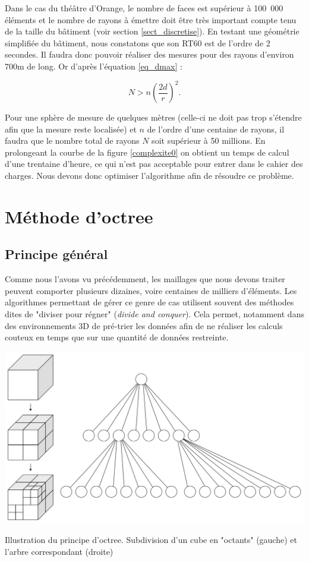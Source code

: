 Dans le cas du théâtre d'Orange, le nombre de faces est supérieur à 100~000 éléments et le nombre de rayons à émettre doit être très important compte tenu de la taille du bâtiment (voir section \ref{sect_discretise}). En testant une géométrie simplifiée du bâtiment, nous constatons que son \gls{RT60} est de l'ordre de 2 secondes. Il faudra donc pouvoir réaliser des mesures pour des rayons d'environ 700m de long. Or d'après l'équation \ref{eq_dmax} :

\begin{equation}
N > n\left(\frac{2d}{r}\right)^2.
\end{equation}

Pour une sphère de mesure de quelques mètres (celle-ci ne doit pas trop s'étendre afin que la mesure reste localisée) et $n$ de l'ordre d'une centaine de rayons, il faudra que le nombre total de rayons $N$ soit supérieur à 50 millions. En prolongeant la courbe de la figure \ref{complexite0} on obtient un temps de calcul d'une trentaine d'heure, ce qui n'est pas acceptable pour entrer dans le cahier des charges. Nous devons donc optimiser l'algorithme afin de résoudre ce problème.

\section{Méthode d'octree}
\subsection{Principe général} \label{sect_octree_gene}

Comme nous l'avons vu précédemment, les maillages que nous devons traiter peuvent comporter plusieurs dizaines, voire centaines de milliers d'éléments. Les algorithmes permettant de gérer ce genre de cas utilisent souvent des méthodes dites de "diviser pour régner" (\textit{divide and conquer}). Cela permet, notamment dans des environnements 3D de pré-trier les données afin de ne réaliser les calculs couteux en temps que sur une quantité de données restreinte. %

\begin{figureth}
	\includegraphics[width=0.6\linewidth]{images/octree}
	\caption{Illustration du principe d'\gls{octree}. Subdivision d'un cube en "octants" (gauche) et l'arbre correspondant (droite)}
	\label{octree}
\end{figureth}


